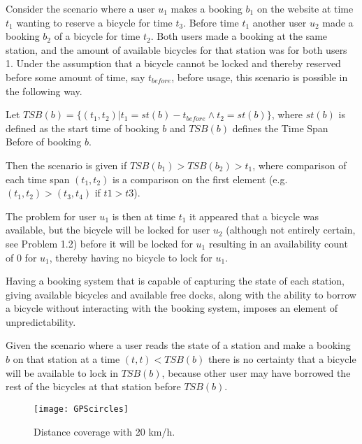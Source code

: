 \begin{description}[style=nextline]
\item[Problem 1.1] Consider the scenario where a user $u_1$ makes a booking $b_1$ on the website at time $t_1$ wanting to reserve a bicycle for time $t_3$. Before time $t_1$ another user $u_2$ made a booking $b_2$ of a bicycle for time $t_2$. Both users made a booking at the same station, and the amount of available bicycles for that station was for both users 1. Under the assumption that a bicycle cannot be locked and thereby reserved before some amount of time, say $t_{before}$, before usage, this scenario is possible in the following way.

Let $TSB(b) = \{(t_1,t_2) | t_1 = st(b) - t_{before} \wedge t_2 = st(b) \}$, where $st(b)$ is defined as the start time of booking $b$ and $TSB(b)$ defines the Time Span Before of booking $b$.

Then the scenario is given if $TSB(b_1) > TSB(b_2) > t_1$, where comparison of each time span $(t_1, t_2)$ is a comparison on the first element (e.g. $(t_1, t_2) > (t_3, t_4)$ if $t1 > t3$).

The problem for user $u_1$ is then at time $t_1$ it appeared that a bicycle was available, but the bicycle will be locked for user $u_2$ (although not entirely certain, see Problem 1.2) before it will be locked for $u_1$ resulting in an availability count of 0 for $u_1$, thereby having no bicycle to lock for $u_1$.

\item[Problem 1.2] Having a booking system that is capable of capturing the state of each station, giving available bicycles and available free docks, along with the ability to borrow a bicycle without interacting with the booking system, imposes an element of unpredictability.

Given the scenario where a user reads the state of a station and make a booking $b$ on that station at a time $(t,t) < TSB(b)$ there is no certainty that a bicycle will be available to lock in $TSB(b)$, because other user may have borrowed the rest of the bicycles at that station before $TSB(b)$.

\item[Problem 1.3]
\begin{figure}
	\centering
	\texttt{[image: GPScircles]}
	\caption{Distance coverage with 20 km/h.}
	\label{fig:gpsCircles}
\end{figure}
\end{description}

